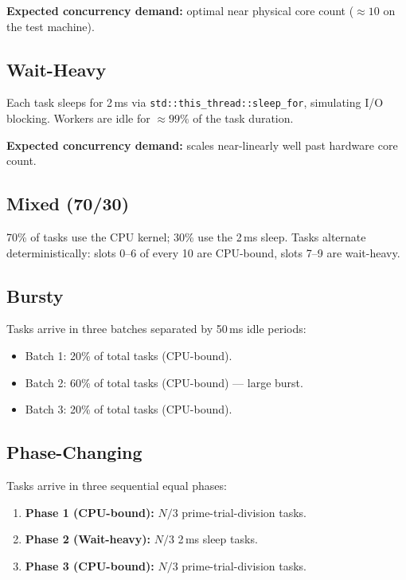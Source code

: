 \documentclass[12pt,a4paper]{article}
\begin{document}
\textbf{Expected concurrency demand:} optimal near physical core count
($\approx 10$ on the test machine).

\subsection{Wait-Heavy}

Each task sleeps for 2\,ms via \texttt{std::this\_thread::sleep\_for},
simulating I/O blocking.
Workers are idle for $\approx 99\%$ of the task duration.

\textbf{Expected concurrency demand:} scales near-linearly well past
hardware core count.

\subsection{Mixed (70/30)}

70\% of tasks use the CPU kernel; 30\% use the 2\,ms sleep.
Tasks alternate deterministically: slots 0--6 of every 10 are CPU-bound,
slots 7--9 are wait-heavy.

\subsection{Bursty}

Tasks arrive in three batches separated by 50\,ms idle periods:
\begin{itemize}
  \item Batch 1: 20\% of total tasks (CPU-bound).
  \item Batch 2: 60\% of total tasks (CPU-bound) --- large burst.
  \item Batch 3: 20\% of total tasks (CPU-bound).
\end{itemize}

\subsection{Phase-Changing}

Tasks arrive in three sequential equal phases:
\begin{enumerate}
  \item \textbf{Phase 1 (CPU-bound):} $N/3$ prime-trial-division tasks.
  \item \textbf{Phase 2 (Wait-heavy):} $N/3$ 2\,ms sleep tasks.
  \item \textbf{Phase 3 (CPU-bound):} $N/3$ prime-trial-division tasks.
\end{enumerate}
\end{document}
